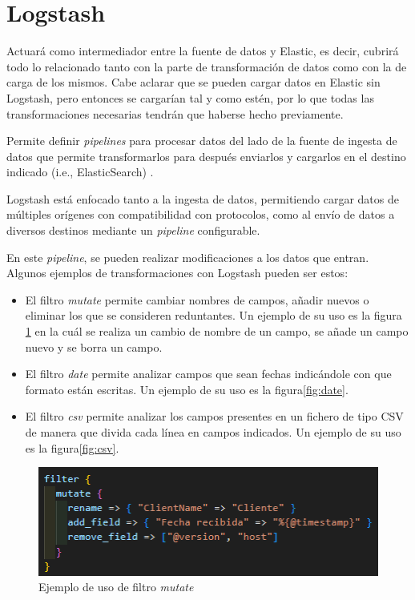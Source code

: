 \section{Logstash}
Actuará como intermediador entre la fuente de datos y Elastic, es decir, cubrirá todo lo relacionado tanto con la parte de transformación de datos como con la de carga de los mismos. Cabe aclarar que se pueden cargar datos en Elastic sin Logstash, pero entonces se cargarían tal y como estén, por lo que todas las transformaciones necesarias tendrán que haberse hecho previamente. 

Permite definir \textit{pipelines} para procesar datos del lado de la fuente de ingesta de datos que permite transformarlos para después enviarlos y cargarlos en el destino indicado (i.e., ElasticSearch) \cite{Logstash}.

Logstash está enfocado tanto a la ingesta de datos, permitiendo cargar datos de múltiples orígenes con compatibilidad con protocolos, como al envío de datos a diversos destinos mediante un \textit{pipeline} configurable.

En este \textit{pipeline}, se pueden realizar modificaciones a los datos que entran. Algunos ejemplos de transformaciones con Logstash pueden ser estos:
\begin{itemize}
    \item El filtro \textit{mutate} permite cambiar nombres de campos, añadir nuevos o eliminar los que se consideren reduntantes. Un ejemplo de su uso es la figura \ref{fig:mutate} en la cuál se realiza un cambio de nombre de un campo, se añade un campo nuevo y se borra un campo.
    \item El filtro \textit{date} permite analizar campos que sean fechas indicándole con que formato están escritas. Un ejemplo de su uso es la figura\ref{fig:date}.
    \item El filtro \textit{csv} permite analizar los campos presentes en un fichero de tipo CSV de manera que divida cada línea en campos indicados. Un ejemplo de su uso es la figura\ref{fig:csv}.

\end{itemize}

\begin{figure}
    \centering
    \includegraphics[width=1\linewidth]{img/mutate.png}
    \caption{Ejemplo de uso de filtro \textit{mutate}}
    \label{fig:mutate}
\end{figure}

